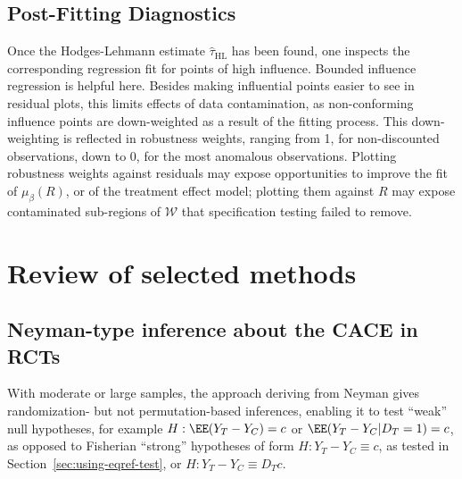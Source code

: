 \subsection{Post-Fitting Diagnostics} \label{sec:post-fitt-diagn}
Once the Hodges-Lehmann estimate $\hat{\tau}_{\mathrm{HL}}$ has been found, one
inspects the corresponding regression fit for points of high influence.
Bounded influence regression is helpful here.  Besides making
influential points easier to see in residual plots, this limits
effects of data contamination, as non-conforming influence points are
down-weighted as a result of the fitting process. This down-weighting
is reflected in robustness weights, ranging from 1, for non-discounted
observations, down to 0, for the most anomalous observations.
Plotting %
robustness weights against residuals may expose opportunities to
improve the fit of $\mu_{\beta}(R)$, or of the treatment effect model;
plotting them against $R$ may expose contaminated sub-regions
of $\mathcal{W}$ that specification testing failed to remove.




\section{Review of selected methods}\label{sec:revi-select-meth}


\subsection{Neyman-type inference about the CACE in RCTs}\label{sec:randProc}

With moderate or large samples, the approach deriving from Neyman
\citeyearpar{neyman:1935} gives randomization- but not
permutation-based inferences, enabling it to test ``weak'' null
hypotheses, for example $H: \EE(Y_T - Y_C) =c$ or
$\EE(Y_{T} - Y_{C}| D_{T}=1) =c$, as opposed to Fisherian ``strong''
hypotheses of form $H: Y_T - Y_C \equiv c$, as tested in
Section~\ref{sec:using-eqref-test}, or $H: Y_T - Y_C \equiv D_{T}c$.

